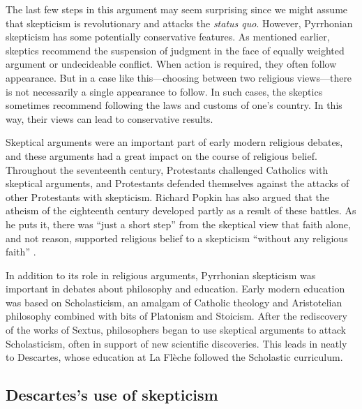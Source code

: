 The last few steps in this argument may seem surprising since we might assume that skepticism is revolutionary and attacks the \textit{status quo}. However, Pyrrhonian skepticism has some potentially conservative features. As mentioned earlier, skeptics recommend the suspension of judgment in the face of equally weighted argument or undecideable conflict. When action is required, they often follow appearance. But in a case like this---choosing between two religious views---there is not necessarily a single appearance to follow. In such cases, the skeptics sometimes recommend following the laws and customs of one's country. In this way, their views can lead to conservative results.

Skeptical arguments were an important part of early modern religious debates, and these arguments had a great impact on the course of religious belief. Throughout the seventeenth century, Protestants challenged Catholics with skeptical arguments, and Protestants defended themselves against the attacks of other Protestants with skepticism. Richard Popkin has also argued that the atheism of the eighteenth century developed partly as a result of these battles. As he puts it, there was ``just a short step'' from the skeptical view that faith alone, and not reason, supported religious belief to a skepticism ``without any religious faith'' \parencite[19]{popkin1993}.

In addition to its role in religious arguments, Pyrrhonian skepticism was important in debates about philosophy and education. Early modern education was based on Scholasticism, an amalgam of Catholic theology and Aristotelian philosophy combined with bits of Platonism and Stoicism. After the rediscovery of the works of Sextus, philosophers began to use skeptical arguments to attack Scholasticism, often in support of new scientific discoveries. This leads in neatly to Descartes, whose education at La Flèche followed the Scholastic curriculum.

\subsection*{Descartes's use of skepticism}

